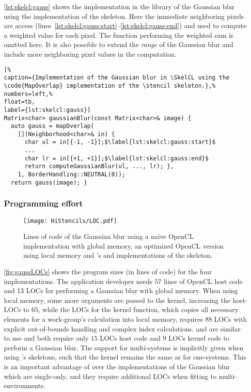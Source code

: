 \autoref{lst:skelcl:gauss} shows the implementation in the \SkelCL library of the Gaussian blur using the  implementation of the \stencil skeleton.
Here the immediate neighboring pixels are access (lines~\ref{lst:skelcl:gauss:start}--\ref{lst:skelcl:gauss:end}) and used to compute a weighted value for each pixel.
The function performing the weighted sum is omitted here.
It is also possible to extend the \emph{range} of the Gaussian blur and include more neighboring pixel values in the computation.

\begin{lstlisting}[%                                                             
caption={Implementation of the Gaussian blur in \SkelCL using the \code{MapOverlap} implementation of the \stencil skeleton.},%
numbers=left,%
float=tb,
label={lst:skelcl:gauss}]
Matrix<char> gaussianBlur(const Matrix<char>& image) {
  auto gauss = mapOverlap(
    [](Neighborhood<char>& in) {
      char ul = in[{-1, -1}];$\label{lst:skelcl:gauss:start}$
      ...
      char lr = in[{+1, +1}];$\label{lst:skelcl:gauss:end}$
      return computeGaussianBlur(ul, ..., lr); },
    1, BorderHandling::NEUTRAL(0));
  return gauss(image); }
\end{lstlisting}

\subsubsection*{Programming effort}

\begin{figure}[tbp]
	\centering
	\texttt{[image: HiStencils/LOC.pdf]}
	\caption{Lines of code of the Gaussian blur using a na{\"i}ve OpenCL implementation with global memory, an optimized OpenCL version using local memory and \SkelCL's  and  implementations of the \stencil skeleton.}
	\label{fig:gaussLOCs}
\end{figure} 

\autoref{fig:gaussLOCs} shows the program sizes (in lines of code) for the four implementations. 
The application developer needs $57$ lines of OpenCL host code and 13 LOCs for performing a Gaussian blur with global memory. 
When using local memory, some more arguments are passed to the kernel, increasing the host-LOCs to $65$, while the LOCs for the kernel function, which copies all necessary elements for a work-group's calculation into local memory, requires $88$ LOCs with explicit out-of-bounds handling and complex index calculations.
 and  are similar to use and both require only $15$ LOCs host code and $9$ LOCs kernel code to perform a Gaussian blur. 
The support for multi-\GPU systems is implicitly given when using \SkelCL's skeletons, such that the kernel remains the same as for one-\GPU systems.
This is an important advantage of \SkelCL over the \OpenCL implementations of the Gaussian blur which are single-\GPU only, and they require additional LOCs when fitting to multi-\GPU environments.

